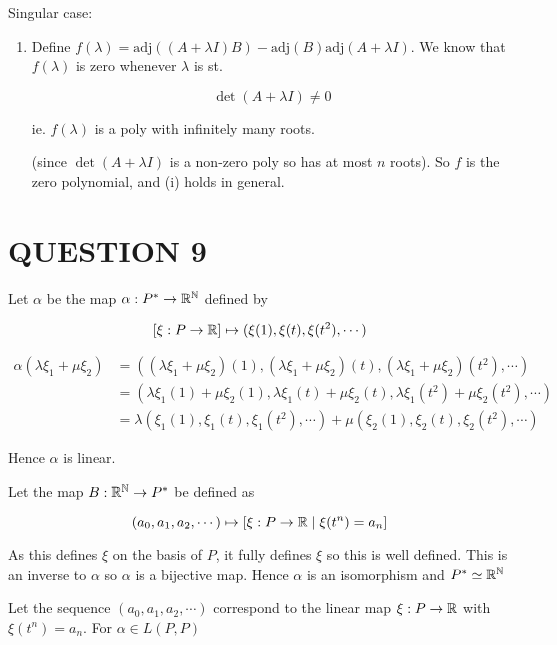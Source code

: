 \documentclass[a4paper]{article}
\begin{document}
Singular case: 

\begin{enumerate}
	\item Define $ f(\lambda) = \text{adj}((A + \lambda I) B) - \text{adj}(B)\text{adj}(A + \lambda I) $. We know that $ f(\lambda) $ is zero whenever $ \lambda $ is st. 
	
	\[ \det(A + \lambda I) \neq 0 \]
	
	ie. $ f(\lambda) $ is a poly with infinitely many roots.
	
	(since $ \det(A + \lambda I) $ is a non-zero poly so has at most $ n $ roots). So $ f $ is the zero polynomial, and (i) holds in general. 	
\end{enumerate}


\section{QUESTION 9}

Let $ \alpha $ be the map $ \alpha : P^{*} \to \mathbb{R}^{\mathbb{N}}  $ defined by 

\[ [\xi : P \to \mathbb{R}] \mapsto (\xi(1),\xi(t),\xi(t^{2}),\cdots)  \]

\begin{align*}
\alpha (\lambda \xi_{1} + \mu \xi_{2}) & = ( (\lambda \xi_{1} + \mu \xi_{2})(1),(\lambda \xi_{1} + \mu \xi_{2})(t),(\lambda \xi_{1} + \mu \xi_{2})(t^{2}),\cdots)  \\
& = (\lambda \xi_{1}(1)  + \mu \xi_{2}(1), \lambda \xi_{1}(t)  + \mu \xi_{2}(t), \lambda \xi_{1}(t^{2})  + \mu \xi_{2}(t^{2}), \cdots  ) \\
& = \lambda(  \xi_{1}(1), \xi_{1}(t), \xi_{1}(t^{2}), \cdots ) + \mu ( \xi_{2}(1),\xi_{2}(t),\xi_{2}(t^{2}),\cdots )    
\end{align*}

Hence $ \alpha $ is linear. 

Let the map $ B : \mathbb{R}^{\mathbb{N}} \to P^{*} $ be defined as

\[ (a_{0},a_{1},a_{2},\cdots) \mapsto [ \xi : P \to \mathbb{R} \; | \; \xi(t^{n}) = a_{n} ] \]

As this defines $ \xi $ on the basis of $ P $, it fully defines $ \xi $ so this is well defined. This is an inverse to $ \alpha $ so $ \alpha $ is a bijective map. Hence $ \alpha $ is an isomorphism and $ P^{*} \simeq \mathbb{R}^{\mathbb{N}} $


Let the sequence $ (a_{0},a_{1},a_{2},\cdots) $ correspond to the linear map $ \xi : P  \to \mathbb{R} $ with $ \xi(t^{n}) = a_{n} $. For $ \alpha \in L(P,P) $
\end{document}
